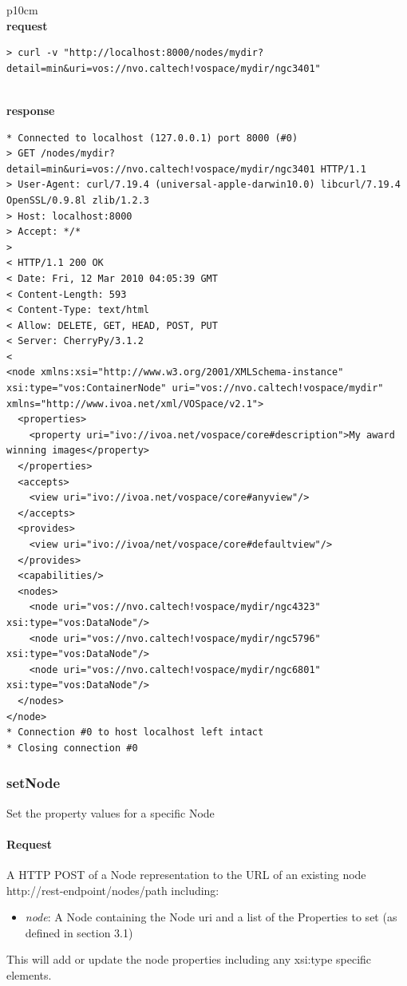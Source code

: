 \documentclass[11pt,a4paper]{ivoa}
\begin{document}
\begin{tabular}{ p{10cm} }
\\
\textbf{request} \\
\begin{lstlisting}
> curl -v "http://localhost:8000/nodes/mydir?detail=min&uri=vos://nvo.caltech!vospace/mydir/ngc3401"
\end{lstlisting} \\
\textbf{response} \\
\begin{lstlisting}
* Connected to localhost (127.0.0.1) port 8000 (#0)
> GET /nodes/mydir?detail=min&uri=vos://nvo.caltech!vospace/mydir/ngc3401 HTTP/1.1
> User-Agent: curl/7.19.4 (universal-apple-darwin10.0) libcurl/7.19.4 OpenSSL/0.9.8l zlib/1.2.3
> Host: localhost:8000
> Accept: */*
> 
< HTTP/1.1 200 OK
< Date: Fri, 12 Mar 2010 04:05:39 GMT
< Content-Length: 593
< Content-Type: text/html
< Allow: DELETE, GET, HEAD, POST, PUT
< Server: CherryPy/3.1.2
< 
<node xmlns:xsi="http://www.w3.org/2001/XMLSchema-instance"
xsi:type="vos:ContainerNode" uri="vos://nvo.caltech!vospace/mydir"
xmlns="http://www.ivoa.net/xml/VOSpace/v2.1">
  <properties>
    <property uri="ivo://ivoa.net/vospace/core#description">My award winning images</property>
  </properties>
  <accepts>
    <view uri="ivo://ivoa.net/vospace/core#anyview"/>
  </accepts>
  <provides>
    <view uri="ivo://ivoa/net/vospace/core#defaultview"/>
  </provides>
  <capabilities/>
  <nodes>
    <node uri="vos://nvo.caltech!vospace/mydir/ngc4323" xsi:type="vos:DataNode"/>
    <node uri="vos://nvo.caltech!vospace/mydir/ngc5796" xsi:type="vos:DataNode"/>
    <node uri="vos://nvo.caltech!vospace/mydir/ngc6801" xsi:type="vos:DataNode"/>
  </nodes>
</node>
* Connection #0 to host localhost left intact
* Closing connection #0
\end{lstlisting}
\end{tabular}

\subsubsection{setNode}
\label{subsubsec:setnode}
Set the property values for a specific Node

\paragraph{Request}
A HTTP POST of a Node representation to the URL of an existing node http://rest-endpoint/nodes/path including:
\begin{itemize}
    \item \emph{node}: A Node containing the Node uri and a list of the Properties to set (as defined in section 3.1)
\end{itemize}
This will add or update the node properties including any xsi:type specific elements.
\end{document}
